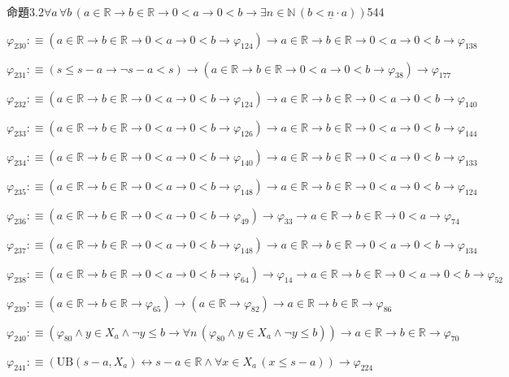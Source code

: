 \begin{fullproof}{命題3.2}{$\forall a\,\forall b\,(a \in \mathbb{R} \to b \in \mathbb{R} \to 0 < a \to 0 < b \to \exists n \in \mathbb{N}\,(b < \underline{n} \cdot a))$}{544}
\begin{abbrevlist}
\item $\varphi_{230} :\equiv (a \in \mathbb{R} \to b \in \mathbb{R} \to 0 < a \to 0 < b \to \varphi_{124}) \to a \in \mathbb{R} \to b \in \mathbb{R} \to 0 < a \to 0 < b \to \varphi_{138}$
\item $\varphi_{231} :\equiv (s \leq s - a \to \neg s - a < s) \to (a \in \mathbb{R} \to b \in \mathbb{R} \to 0 < a \to 0 < b \to \varphi_{38}) \to \varphi_{177}$
\item $\varphi_{232} :\equiv (a \in \mathbb{R} \to b \in \mathbb{R} \to 0 < a \to 0 < b \to \varphi_{124}) \to a \in \mathbb{R} \to b \in \mathbb{R} \to 0 < a \to 0 < b \to \varphi_{140}$
\item $\varphi_{233} :\equiv (a \in \mathbb{R} \to b \in \mathbb{R} \to 0 < a \to 0 < b \to \varphi_{126}) \to a \in \mathbb{R} \to b \in \mathbb{R} \to 0 < a \to 0 < b \to \varphi_{144}$
\item $\varphi_{234} :\equiv (a \in \mathbb{R} \to b \in \mathbb{R} \to 0 < a \to 0 < b \to \varphi_{140}) \to a \in \mathbb{R} \to b \in \mathbb{R} \to 0 < a \to 0 < b \to \varphi_{133}$
\item $\varphi_{235} :\equiv (a \in \mathbb{R} \to b \in \mathbb{R} \to 0 < a \to 0 < b \to \varphi_{148}) \to a \in \mathbb{R} \to b \in \mathbb{R} \to 0 < a \to 0 < b \to \varphi_{124}$
\item $\varphi_{236} :\equiv (a \in \mathbb{R} \to b \in \mathbb{R} \to 0 < a \to 0 < b \to \varphi_{49}) \to \varphi_{33} \to a \in \mathbb{R} \to b \in \mathbb{R} \to 0 < a \to \varphi_{74}$
\item $\varphi_{237} :\equiv (a \in \mathbb{R} \to b \in \mathbb{R} \to 0 < a \to 0 < b \to \varphi_{148}) \to a \in \mathbb{R} \to b \in \mathbb{R} \to 0 < a \to 0 < b \to \varphi_{134}$
\item $\varphi_{238} :\equiv (a \in \mathbb{R} \to b \in \mathbb{R} \to 0 < a \to 0 < b \to \varphi_{64}) \to \varphi_{14} \to a \in \mathbb{R} \to b \in \mathbb{R} \to 0 < a \to 0 < b \to \varphi_{52}$
\item $\varphi_{239} :\equiv (a \in \mathbb{R} \to b \in \mathbb{R} \to \varphi_{65}) \to (a \in \mathbb{R} \to \varphi_{82}) \to a \in \mathbb{R} \to b \in \mathbb{R} \to \varphi_{86}$
\item $\varphi_{240} :\equiv (\varphi_{80} \land y \in X_{a} \land \neg y \leq b \to \forall n\,(\varphi_{80} \land y \in X_{a} \land \neg y \leq b)) \to a \in \mathbb{R} \to b \in \mathbb{R} \to \varphi_{70}$
\item $\varphi_{241} :\equiv (\mathrm{UB}(s - a,X_{a}) \leftrightarrow s - a \in \mathbb{R} \land \forall x \in X_{a}\,(x \leq s - a)) \to \varphi_{224}$

\end{abbrevlist}
\end{fullproof}
